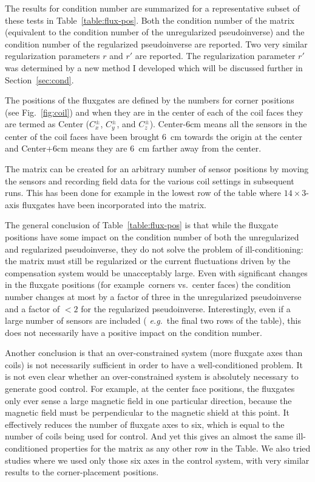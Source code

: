 The results for condition number are summarized for a representative
subset of these tests in Table~\ref{table:flux-pos}.  Both the
condition number of the matrix (equivalent to the condition number of
the unregularized pseudoinverse) and the condition number of the
regularized pseudoinverse are reported.  Two very similar
regularization parameters $r$ and $r'$ are reported.  The
regularization parameter $r'$ was determined by a new method I
developed which will be discussed further in
Section~\ref{sec:cond}.

The positions of the fluxgates are defined by the numbers for corner
positions (see Fig.~\ref{fig:coil}) and when they are in the center of
each of the coil faces they are termed as Center ($C_x^\pm$, $C_y^\pm$, and
$C_z^\pm$). Center-6cm means all the sensors in the center of the coil
faces have been brought 6~cm towards the origin at the center and
Center+6cm means they are 6~cm farther away from the center.

The matrix can be created for an arbitrary number of sensor positions
by moving the sensors and recording field data for the various coil
settings in subsequent runs.  This has been done for example in the
lowest row of the table where $14\times 3$-axis fluxgates have been
incorporated into the matrix.

The general conclusion of Table~\ref{table:flux-pos} is that while the
fluxgate positions have some impact on the condition number of both
the unregularized and regularized pseudoinverse, they do not solve the
problem of ill-conditioning: the matrix must still be regularized or
the current fluctuations driven by the compensation system would be
unacceptably large.  Even with significant changes in the fluxgate
positions (for example~corners vs.~center faces) the condition number
changes at most by a factor of three in the unregularized
pseudoinverse and a factor of $<2$ for the regularized pseudoinverse.
Interestingly, even if a large number of sensors are included ({\it
e.g.}~the final two rows of the table), this does not necessarily have
a positive impact on the condition number.

Another conclusion is that an over-constrained system (more fluxgate
axes than coils) is not necessarily sufficient in order to have a
well-conditioned problem.  It is not even clear whether an
over-constrained system is absolutely necessary to generate good
control.  For example, at the center face positions, the fluxgates
only ever sense a large magnetic field in one particular direction,
because the magnetic field must be perpendicular to the magnetic
shield at this point.  It effectively reduces the number of fluxgate
axes to six, which is equal to the number of coils being used for
control.  And yet this gives an almost the same ill-conditioned
properties for the matrix as any other row in the Table.  We also
tried studies where we used only those six axes in the control system,
with very similar results to the corner-placement positions.

